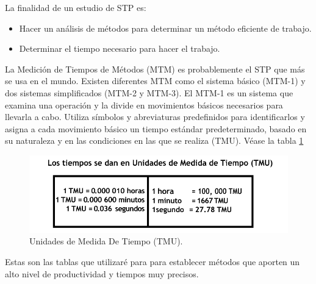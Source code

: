     La finalidad de un estudio de STP es:
    \begin{itemize}
    \item Hacer un análisis de métodos para determinar un método eficiente de trabajo.
    \item Determinar el tiempo necesario para hacer el trabajo. 
    \end{itemize}
    La Medición de Tiempos de Métodos (MTM) es probablemente el STP que más se usa en el mundo. Existen diferentes MTM como el sistema básico (MTM-1) y dos sistemas simplificados (MTM-2 y MTM-3).
    El MTM-1 es un sistema que examina una operación y la divide en movimientos básicos necesarios para llevarla a cabo. Utiliza símbolos y abreviaturas predefinidos para identificarlos y asigna a cada movimiento básico un tiempo estándar predeterminado, basado en su naturaleza y en las condiciones en las que se realiza (TMU). Véase la tabla \ref{fig:tablaTMU}
    \begin{figure}[H]
        \centering
        \includegraphics[scale=0.6]{3/Img/tablaTMU.pdf}
        \caption{Unidades de Medida De Tiempo (TMU).}
        \label{fig:tablaTMU}
    \end{figure}
    Estas son las tablas que utilizaré para para establecer métodos que aporten un alto nivel de productividad y tiempos muy precisos.
    
